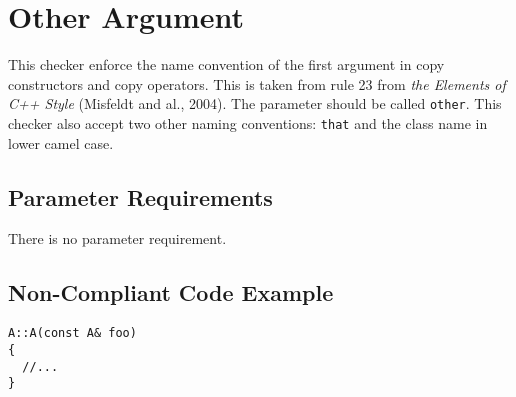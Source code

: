 %
%

\section{Other Argument}

\label{OtherArgument::overview}

This checker enforce the name convention of the first argument in copy
constructors and copy operators. This is taken from rule 23 from
\emph{the Elements of C++ Style} (Misfeldt and al., 2004). The
parameter should be called \texttt{other}. This checker also accept
two other naming conventions: \texttt{that} and the class name in
lower camel case.

\subsection{Parameter Requirements}

There is no parameter requirement.

\subsection{Non-Compliant Code Example}

\begin{verbatim}
A::A(const A& foo)
{
  //...
}
\end{verbatim}

